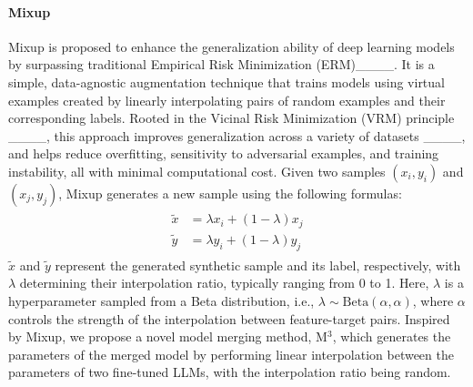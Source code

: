 \paragraph{\textbf{{Mixup}}}
Mixup is proposed to enhance the generalization ability of deep learning models by surpassing traditional Empirical Risk Minimization (ERM)____. It is a simple, data-agnostic augmentation technique that trains models using virtual examples created by linearly interpolating pairs of random examples and their corresponding labels. Rooted in the Vicinal Risk Minimization (VRM) principle ____, this approach improves generalization across a variety of datasets ____, and helps reduce overfitting, sensitivity to adversarial examples, and training instability, all with minimal computational cost. Given two samples $(x_i, y_i)$ and $(x_j, y_j)$, Mixup generates a new sample using the following formulas:
\begin{align}
\begin{aligned}
\tilde{x} &= \lambda x_i + (1 - \lambda) x_j \\
\tilde{y} &= \lambda y_i + (1 - \lambda) y_j
\end{aligned}
\end{align}
$\tilde{x}$ and $\tilde{y}$ represent the generated synthetic sample and its label, respectively, with $\lambda$ determining their interpolation ratio, typically ranging from 0 to 1. Here, $\lambda$ is a hyperparameter sampled from a Beta distribution, i.e., $\lambda \sim \text{Beta}(\alpha, \alpha)$, where $\alpha$ controls the strength of the interpolation between feature-target pairs.
Inspired by Mixup, we propose a novel model merging method, M$^3$, which generates the parameters of the merged model by performing linear interpolation between the parameters of two fine-tuned LLMs, with the interpolation ratio being random.